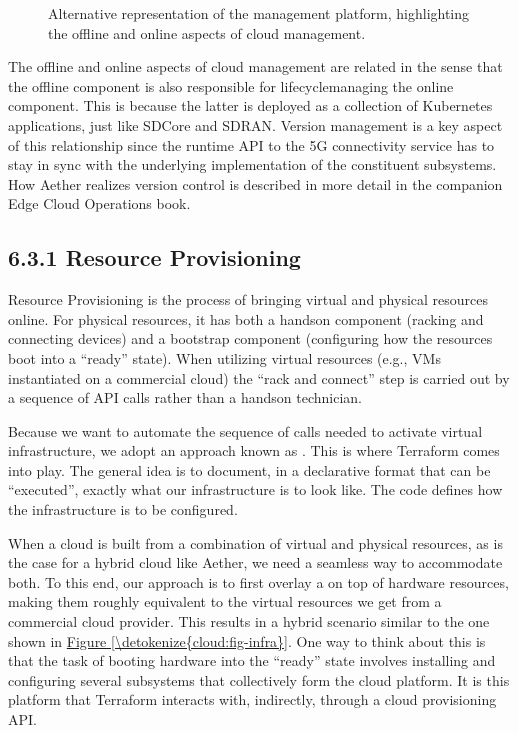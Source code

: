 \documentclass[a4paper,11pt,english]{sphinxmanual}
\let\sphinxpxdimen\pdfpxdimen\else\newdimen\sphinxpxdimen
\begin{document}
\begin{figure}[ht]
\centering
\capstart

\noindent\sphinxincludegraphics[width=500\sphinxpxdimen]{{Slide111}.png}
\caption{Alternative representation of the management platform, highlighting
the offline and online aspects of cloud management.}\label{\detokenize{cloud:id5}}\label{\detokenize{cloud:fig-2d}}\end{figure}

\sphinxAtStartPar
The offline and online aspects of cloud management are related in the
sense that the offline component is also responsible for
lifecycle\sphinxhyphen{}managing the online component. This is because the latter is
deployed as a collection of Kubernetes applications, just like SD\sphinxhyphen{}Core
and SD\sphinxhyphen{}RAN. Version management is a key aspect of this relationship
since the runtime API to the 5G connectivity service has to stay in
sync with the underlying implementation of the constituent
subsystems. How Aether realizes version control is described in more
detail in the companion Edge Cloud Operations book.


\subsection{6.3.1 Resource Provisioning}
\label{\detokenize{cloud:resource-provisioning}}
\sphinxAtStartPar
Resource Provisioning is the process of bringing virtual and physical
resources online. For physical resources, it has both a hands\sphinxhyphen{}on
component (racking and connecting devices) and a bootstrap component
(configuring how the resources boot into a “ready” state). When
utilizing virtual resources (e.g., VMs instantiated on a commercial
cloud) the “rack and connect” step is carried out by a sequence of API
calls rather than a hands\sphinxhyphen{}on technician.

\sphinxAtStartPar
Because we want to automate the sequence of calls needed to activate
virtual infrastructure, we adopt an approach known as
. This is where Terraform comes into play.
The general idea is to document, in a declarative format that can be
“executed”, exactly what our infrastructure is to look like. The code
defines how the infrastructure is to be configured.

\sphinxAtStartPar
When a cloud is built from a combination of virtual and physical
resources, as is the case for a hybrid cloud like Aether, we need a
seamless way to accommodate both. To this end, our approach is to
first overlay a  on top of hardware resources,
making them roughly equivalent to the virtual resources we get from a
commercial cloud provider. This results in a hybrid scenario similar
to the one shown in \hyperref[\detokenize{cloud:fig-infra}]{Figure \ref{\detokenize{cloud:fig-infra}}}. One way to think
about this is that the task of booting hardware into the “ready” state
involves installing and configuring several subsystems that
collectively form the cloud platform. It is this platform that
Terraform interacts with, indirectly, through a cloud provisioning API.
\end{document}
